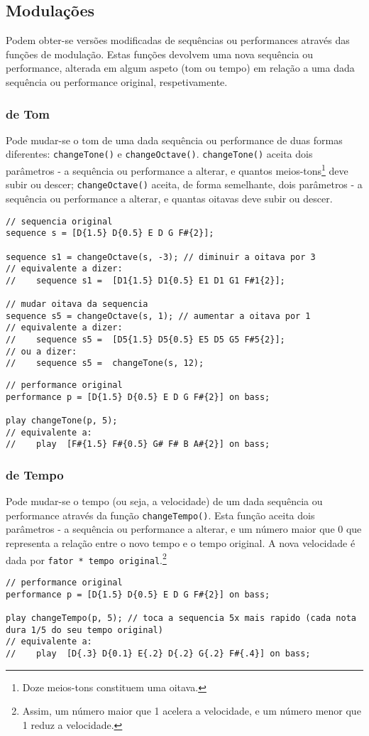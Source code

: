 \documentclass{article}
\begin{document}
\subsection{Modulações}
Podem obter-se versões modificadas de sequências ou performances através das funções de modulação. Estas funções devolvem uma nova sequência ou performance, alterada em algum aspeto (tom ou tempo) em relação a uma dada sequência  ou performance original, respetivamente.
\subsubsection{de Tom}
Pode mudar-se o tom de uma dada sequência ou performance de duas formas diferentes: \texttt{changeTone()} e \texttt{changeOctave()}. \texttt{changeTone()} aceita dois parâmetros - a sequência ou performance a alterar, e quantos meios-tons\footnote{Doze meios-tons constituem uma oitava.} deve subir ou descer; \texttt{changeOctave()} aceita, de forma semelhante, dois parâmetros - a sequência ou performance a alterar, e quantas oitavas deve subir ou descer.

\begin{lstlisting} 
// sequencia original
sequence s = [D{1.5} D{0.5} E D G F#{2}];

sequence s1 = changeOctave(s, -3); // diminuir a oitava por 3
// equivalente a dizer:
//    sequence s1 =  [D1{1.5} D1{0.5} E1 D1 G1 F#1{2}];

// mudar oitava da sequencia
sequence s5 = changeOctave(s, 1); // aumentar a oitava por 1
// equivalente a dizer:
//    sequence s5 =  [D5{1.5} D5{0.5} E5 D5 G5 F#5{2}];
// ou a dizer:
//    sequence s5 =  changeTone(s, 12);
\end{lstlisting}
\begin{lstlisting} 
// performance original
performance p = [D{1.5} D{0.5} E D G F#{2}] on bass;

play changeTone(p, 5);
// equivalente a:
//    play  [F#{1.5} F#{0.5} G# F# B A#{2}] on bass;
\end{lstlisting}

\subsubsection{de Tempo}
Pode mudar-se o tempo (ou seja, a velocidade) de um dada sequência ou performance através da função \texttt{changeTempo()}. Esta função aceita dois parâmetros - a sequência ou performance a alterar, e um número maior que 0 que representa a relação entre o novo tempo e o tempo original. A nova velocidade é dada por \texttt{fator * tempo original}.\footnote{Assim, um número maior que 1 acelera a velocidade, e um número menor que 1 reduz a velocidade.}
\begin{lstlisting} 
// performance original
performance p = [D{1.5} D{0.5} E D G F#{2}] on bass;

play changeTempo(p, 5); // toca a sequencia 5x mais rapido (cada nota dura 1/5 do seu tempo original)
// equivalente a:
//    play  [D{.3} D{0.1} E{.2} D{.2} G{.2} F#{.4}] on bass;
\end{lstlisting}
\end{document}
